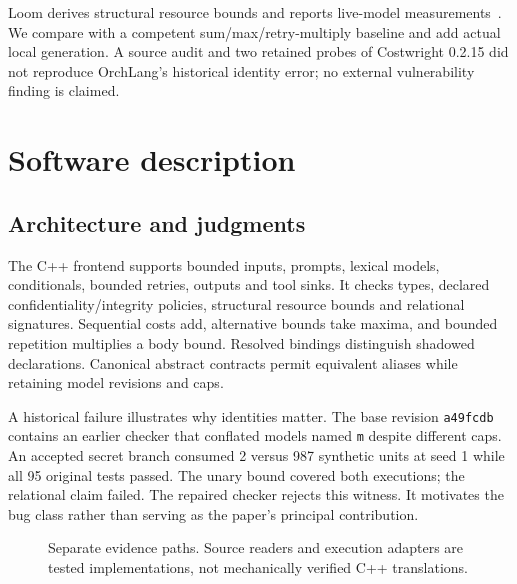 \documentclass[preprint,12pt,a4paper]{elsarticle}
\begin{document}
Loom derives structural resource bounds and reports live-model
measurements~\cite{loom}. We compare with a competent sum/max/retry-multiply
baseline and add actual local generation. A source audit and two retained
probes of Costwright 0.2.15 did not reproduce OrchLang's historical identity
error; no external vulnerability finding is claimed.

\section{Software description}
\subsection{Architecture and judgments}
The C++ frontend supports bounded inputs, prompts, lexical models, conditionals,
bounded retries, outputs and tool sinks. It checks types, declared
confidentiality/integrity policies, structural resource bounds and relational
signatures. Sequential costs add, alternative bounds take maxima, and bounded
repetition multiplies a body bound. Resolved bindings distinguish shadowed
declarations. Canonical abstract contracts permit equivalent aliases while
retaining model revisions and caps.

A historical failure illustrates why identities matter. The base revision
\texttt{a49fcdb} contains an earlier checker that conflated models named
\texttt{m} despite different caps. An accepted secret branch consumed 2 versus
987 synthetic units at seed 1 while all 95 original tests passed. The unary
bound covered both executions; the relational claim failed. The repaired
checker rejects this witness. It motivates the bug class rather than serving
as the paper's principal contribution.

\begin{figure}[!ht]
\centering
{}
\caption{Separate evidence paths. Source readers and execution adapters are
tested implementations, not mechanically verified C++ translations.}
\end{figure}
\end{document}
